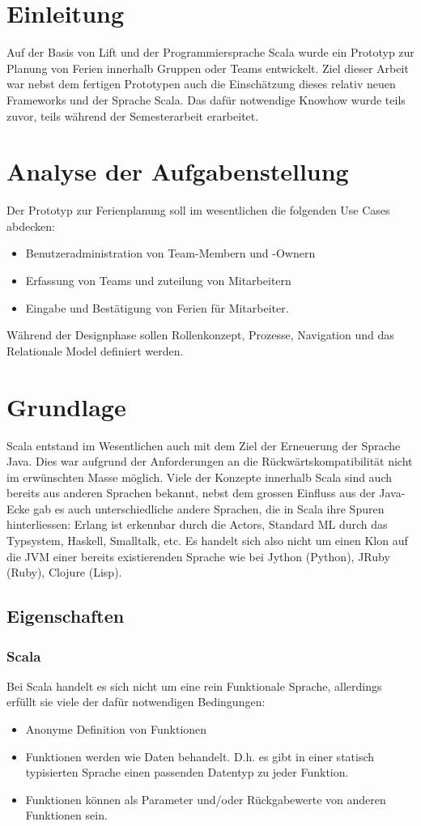 \section{Einleitung}
Auf der Basis von Lift und der Programmiersprache Scala wurde ein Prototyp zur Planung von Ferien innerhalb Gruppen oder Teams entwickelt. Ziel dieser Arbeit war nebst dem fertigen Prototypen auch die Einsch\"atzung dieses relativ neuen Frameworks und der Sprache Scala. Das daf\"ur notwendige Knowhow wurde teils zuvor, teils w\"ahrend der Semesterarbeit erarbeitet. 

\section{Analyse der Aufgabenstellung}
Der Prototyp zur Ferienplanung soll im wesentlichen die folgenden Use Cases abdecken:
\begin{itemize}
\item Benutzeradministration von Team-Membern und -Ownern
\item Erfassung von Teams und zuteilung von Mitarbeitern
\item Eingabe und Best\"atigung von Ferien f\"ur Mitarbeiter.
\end{itemize}

W\"ahrend der Designphase sollen Rollenkonzept, Prozesse, Navigation und das Relationale Model definiert werden.

\section{Grundlage}
Scala entstand im Wesentlichen auch mit dem Ziel der Erneuerung der Sprache Java. Dies war aufgrund der Anforderungen an die R\"uckw\"artskompatibilit\"at nicht im erw\"unschten Masse m\"oglich. 
Viele der Konzepte innerhalb Scala sind auch bereits aus anderen Sprachen bekannt, nebst dem grossen Einfluss aus der Java-Ecke gab es auch unterschiedliche andere Sprachen, die in Scala ihre Spuren hinterliessen: Erlang ist erkennbar durch die Actors, Standard ML durch das Typsystem, Haskell, Smalltalk, etc. Es handelt sich also nicht um einen Klon auf die JVM einer bereits existierenden Sprache wie bei Jython (Python), JRuby (Ruby), Clojure (Lisp). 

\subsection{Eigenschaften}
\subsubsection{Scala}
Bei Scala handelt es sich nicht um eine rein Funktionale Sprache, allerdings erf\"ullt sie viele der daf\"ur notwendigen Bedingungen:
\begin{itemize}
\item Anonyme Definition von Funktionen
\item Funktionen werden wie Daten behandelt. D.h. es gibt in einer statisch typisierten Sprache einen passenden Datentyp zu jeder Funktion.
\item Funktionen k\"onnen als Parameter und/oder R\"uckgabewerte von anderen Funktionen sein.
\end{itemize}

